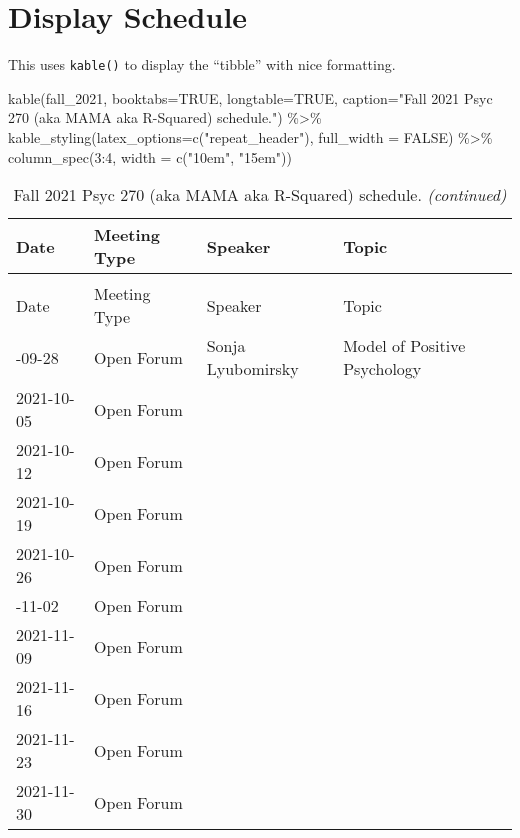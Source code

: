 \documentclass[]{tufte-handout}
\newenvironment{Shaded}{}{}
\newcommand{\AttributeTok}[1]{\textcolor[rgb]{0.49,0.56,0.16}{#1}}
\newcommand{\ConstantTok}[1]{\textcolor[rgb]{0.53,0.00,0.00}{#1}}
\newcommand{\DecValTok}[1]{\textcolor[rgb]{0.25,0.63,0.44}{#1}}
\newcommand{\FunctionTok}[1]{\textcolor[rgb]{0.02,0.16,0.49}{#1}}
\newcommand{\NormalTok}[1]{#1}
\newcommand{\SpecialCharTok}[1]{\textcolor[rgb]{0.25,0.44,0.63}{#1}}
\newcommand{\StringTok}[1]{\textcolor[rgb]{0.25,0.44,0.63}{#1}}
\begin{document}
\hypertarget{display-schedule}{%
\section{Display Schedule}\label{display-schedule}}

This uses \texttt{kable()} to display the ``tibble'' with nice
formatting.

\begin{Shaded}
\begin{Highlighting}[]
\FunctionTok{kable}\NormalTok{(fall\_2021, }\AttributeTok{booktabs=}\ConstantTok{TRUE}\NormalTok{, }\AttributeTok{longtable=}\ConstantTok{TRUE}\NormalTok{, }
      \AttributeTok{caption=}\StringTok{"Fall 2021 Psyc 270 (aka MAMA aka R{-}Squared) schedule."}\NormalTok{) }\SpecialCharTok{\%\textgreater{}\%}
  \FunctionTok{kable\_styling}\NormalTok{(}\AttributeTok{latex\_options=}\FunctionTok{c}\NormalTok{(}\StringTok{"repeat\_header"}\NormalTok{), }\AttributeTok{full\_width =} \ConstantTok{FALSE}\NormalTok{) }\SpecialCharTok{\%\textgreater{}\%}
  \FunctionTok{column\_spec}\NormalTok{(}\DecValTok{3}\SpecialCharTok{:}\DecValTok{4}\NormalTok{, }\AttributeTok{width =} \FunctionTok{c}\NormalTok{(}\StringTok{"10em"}\NormalTok{, }\StringTok{"15em"}\NormalTok{))}
\end{Highlighting}
\end{Shaded}

\begin{longtable}[t]{ll>{\raggedright\arraybackslash}p{10em}>{\raggedright\arraybackslash}p{15em}}
\caption{\label{tab:show-sched}Fall 2021 Psyc 270 (aka MAMA aka R-Squared) schedule.}\\
\toprule
Date & Meeting Type & Speaker & Topic\\
\midrule
\endfirsthead
\caption[]{Fall 2021 Psyc 270 (aka MAMA aka R-Squared) schedule. \textit{(continued)}}\\
\toprule
Date & Meeting Type & Speaker & Topic\\
\midrule
\endhead

\endfoot
\bottomrule
\endlastfoot
2021-09-28 & Open Forum & Sonja Lyubomirsky & Model of Positive Psychology\\
2021-10-05 & Open Forum &  & \\
2021-10-12 & Open Forum &  & \\
2021-10-19 & Open Forum &  & \\
2021-10-26 & Open Forum &  & \\
\addlinespace
2021-11-02 & Open Forum &  & \\
2021-11-09 & Open Forum &  & \\
2021-11-16 & Open Forum &  & \\
2021-11-23 & Open Forum &  & \\
2021-11-30 & Open Forum &  & \\*
\end{longtable}


\end{document}
